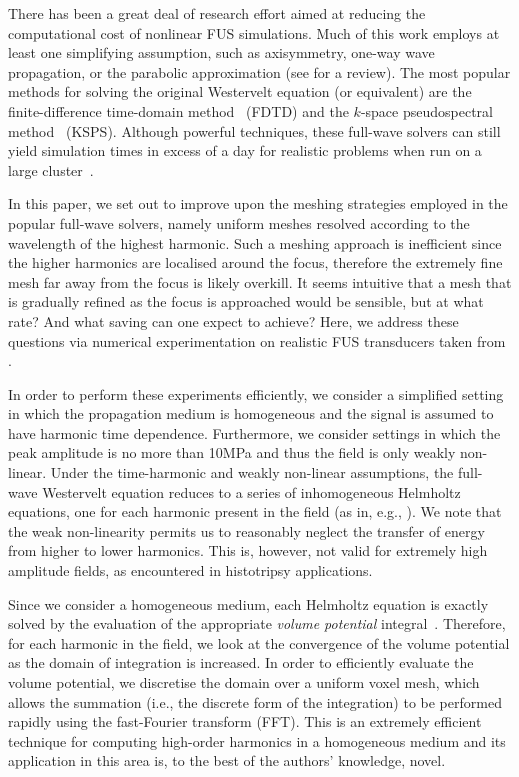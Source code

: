 \documentclass[preprint]{JASA}
\newcommand{\red}[1]{{\color{red} #1}}
\begin{document}
There has been a great deal of research effort aimed at reducing the computational
cost of nonlinear \red{FUS} simulations. Much of this work employs at least one simplifying assumption, 
such as axisymmetry, one-way wave propagation, or the parabolic approximation
(see \cite{gu2015modeling} for a review). The most popular methods for solving 
the original Westervelt equation (or equivalent) are the finite-difference 
time-domain method~\cite{solovchuk2013simulation} (FDTD) and the $k$-space 
pseudospectral method~\cite{treeby2012modeling} (KSPS). Although powerful 
techniques, these full-wave solvers can still yield simulation times in excess 
of a day for realistic problems when run on a large cluster~\cite{jaros2016full}.

In this paper, we set out to improve upon the meshing strategies employed in 
the popular full-wave solvers, namely uniform meshes resolved according 
to the wavelength of the highest harmonic. Such a meshing approach is 
inefficient since the higher harmonics are localised around the focus, 
therefore the extremely fine mesh far away from the focus 
is likely overkill. It seems intuitive that a mesh that is gradually refined 
as the focus is approached would be sensible, but at what rate? And what saving 
can one expect to achieve? Here, we address these questions via numerical 
experimentation on realistic \red{FUS} transducers taken from \cite{sonic}.


In order to perform these experiments efficiently, we consider a simplified setting 
in which the propagation medium is homogeneous and the signal is assumed to have 
harmonic time dependence. \red{Furthermore, we consider settings in which the peak amplitude 
is no more than 10MPa and thus the field is only weakly non-linear}. Under the time-harmonic 
\red{and weakly non-linear assumptions}, the full-wave Westervelt 
equation reduces to a series of inhomogeneous 
Helmholtz equations, one for each harmonic present in the field (as in, e.g., 
\cite{du2013fast}). %
\red{We note that the weak non-linearity permits us to reasonably neglect the 
transfer of energy from higher to lower harmonics. This is, however, not valid for 
extremely high amplitude fields, as encountered in histotripsy applications.}

Since we consider a homogeneous medium, each Helmholtz equation is exactly solved 
by the evaluation of the appropriate \textit{volume potential} integral~\cite{costabel2015spectrum}. 
Therefore, 
for each harmonic in the field, we look at the convergence of the volume potential 
as the domain of integration is increased. In order to efficiently evaluate the 
volume potential, we discretise the domain over a uniform voxel mesh, which allows the 
summation (i.e., the discrete form of the integration) to be performed rapidly 
using the fast-Fourier transform (FFT). This is an extremely efficient technique 
for computing high-order harmonics in a homogeneous medium and its application in 
this area is, to the best of the authors' knowledge, novel.
\end{document}

